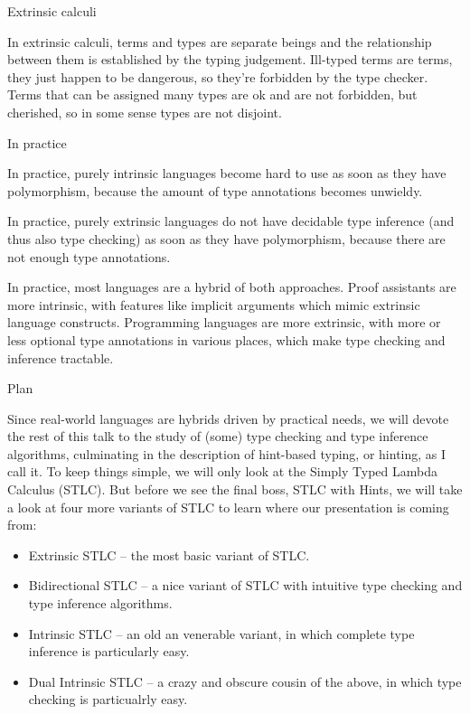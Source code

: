 \documentclass{beamer}
\begin{document}
\begin{frame}{Extrinsic calculi}

In extrinsic calculi, terms and types are separate beings and the relationship between them is established by the typing judgement. Ill-typed terms are terms, they just happen to be dangerous, so they're forbidden by the type checker. Terms that can be assigned many types are ok and are not forbidden, but cherished, so in some sense types are not disjoint.

\end{frame}

\begin{frame}{In practice}

In practice, purely intrinsic languages become hard to use as soon as they have polymorphism, because the amount of type annotations becomes unwieldy.

\vspace{1em}

In practice, purely extrinsic languages do not have decidable type inference (and thus also type checking) as soon as they have polymorphism, because there are not enough type annotations.

\vspace{1em}

In practice, most languages are a hybrid of both approaches. Proof assistants are more intrinsic, with features like implicit arguments which mimic extrinsic language constructs. Programming languages are more extrinsic, with more or less optional type annotations in various places, which make type checking and inference tractable.

\end{frame}

\begin{frame}{Plan}

Since real-world languages are hybrids driven by practical needs, we will devote the rest of this talk to the study of (some) type checking and type inference algorithms, culminating in the description of hint-based typing, or hinting, as I call it. To keep things simple, we will only look at the Simply Typed Lambda Calculus (STLC). But before we see the final boss, STLC with Hints, we will take a look at four more variants of STLC to learn where our presentation is coming from:

\begin{itemize}
  \item Extrinsic STLC -- the most basic variant of STLC.
  \item Bidirectional STLC -- a nice variant of STLC with intuitive type checking and type inference algorithms.
  \item Intrinsic STLC -- an old an venerable variant, in which complete type inference is particularly easy.
  \item Dual Intrinsic STLC -- a crazy and obscure cousin of the above, in which type checking is particualrly easy.
\end{itemize}

\end{frame}
\end{document}

